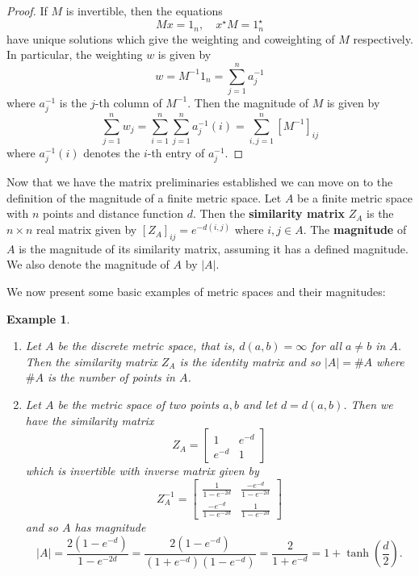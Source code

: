 \documentclass[11pt]{article}
\theoremstyle{mythm}
\newtheorem{ex}[defn]{Example}
\begin{document}
\begin{proof}
If $M$ is invertible, then the equations
\begin{equation*}
Mx = 1_n, \quad x^\star M = 1_n^\star
\end{equation*}
have unique solutions which give the weighting and coweighting of $M$ respectively. In particular, the weighting $w$ is given by
\begin{equation*}
w = M^{-1}1_n = \sum\limits_{j=1}^{n} a_j^{-1}
\end{equation*}
where $a_j^{-1}$ is the $j$-th column of $M^{-1}$. Then the magnitude of $M$ is given by
\begin{equation*}
\sum\limits_{j=1}^{n}w_j = \sum\limits_{i=1}^{n}\sum\limits_{j=1}^{n}a_{j}^{-1}(i) = \sum\limits_{i,j=1}^{n}[M^{-1}]_{ij}
\end{equation*}
where $a_{j}^{-1}(i)$ denotes the $i$-th entry of $a_j^{-1}$.
\end{proof}

Now that we have the matrix preliminaries established we can move on to the definition of the magnitude of a finite metric space. Let $A$ be a finite metric space with $n$ points and distance function $d$. Then the \textbf{similarity matrix} $Z_A$ is the $n\times n$ real matrix given by $[Z_A]_{ij} = e^{-d(i,j)}$ where $i,j \in A$. The \textbf{magnitude} of $A$ is the magnitude of its similarity matrix, assuming it has a defined magnitude. We also denote the magnitude of $A$ by $\vert A\vert$.

We now present some basic examples of metric spaces and their magnitudes:

\begin{ex}
\begin{enumerate}
\item Let $A$ be the discrete metric space, that is, $d(a,b) = \infty$ for all $a \neq b$ in $A$. Then the similarity matrix $Z_A$ is the identity matrix and so $\vert A \vert = \#A$ where $\#A$ is the number of points in $A$.
\item Let $A$ be the metric space of two points $a,b$ and let $d = d(a,b)$. Then we have the similarity matrix
\begin{equation*}
Z_A = \begin{bmatrix} 1 & e^{-d} \\ e^{-d} & 1 \end{bmatrix}
\end{equation*}
which is invertible with inverse matrix given by
\begin{equation*}
Z_A^{-1} = \begin{bmatrix} \frac{1}{1-e^{-2d}} & \frac{-e^{-d}}{1-e^{-2d}} \\ \frac{-e^{-d}}{1-e^{-2d}} & \frac{1}{1-e^{-2d}} \end{bmatrix}
\end{equation*}
and so $A$ has magnitude
\begin{equation*}
\vert A \vert = \frac{2(1-e^{-d})}{1-e^{-2d}} = \frac{2(1-e^{-d})}{(1+e^{-d})(1-e^{-d})} = \frac{2}{1+e^{-d}} = 1+\tanh{\left(\frac{d}{2}\right)}.
\end{equation*}
\end{enumerate}
\end{ex}
\end{document}

